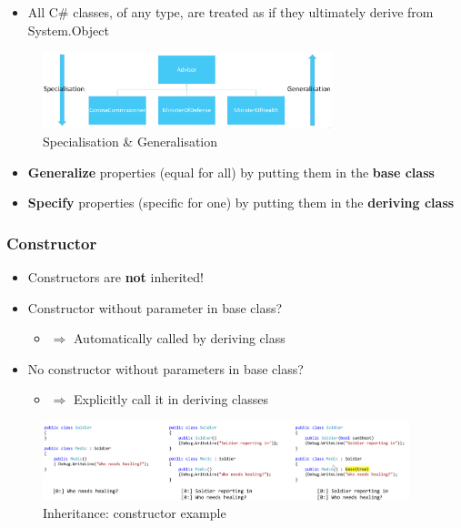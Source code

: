 \documentclass{article}
\newcommand{\bold}[1]{\textbf{#1}}
\begin{document}
\begin{itemize}
    \item All C\# classes, of any type, are treated as if they ultimately derive from System.Object
\end{itemize}

\begin{figure}[H]
    \centering
    \includegraphics[width=0.75\textwidth]{inheritance.png}
    \caption{Specialisation \& Generalisation}
\end{figure}

\begin{itemize}
    \item \bold{Generalize} properties (equal for all) by putting them in the \bold{base class}
    \item \bold{Specify} properties (specific for one) by putting them in the \bold{deriving class}
\end{itemize}

\subsubsection{Constructor}

\begin{itemize}
    \item Constructors are \bold{not} inherited!
    \item Constructor without parameter in base class?
    \begin{itemize}
        \item $\Rightarrow$ Automatically called by deriving class
    \end{itemize}
    \item No constructor without parameters in base class?
    \begin{itemize}
        \item $\Rightarrow$ Explicitly call it in deriving classes
    \end{itemize}
\end{itemize}

\begin{figure}[H]
    \centering
    \includegraphics[width=0.95\textwidth]{inheritance-constructor.png}
    \caption{Inheritance: constructor example}
\end{figure}
\end{document}
